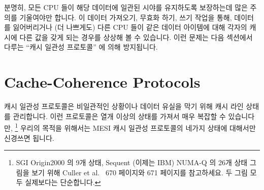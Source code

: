 분명히, 모든 CPU 들이 해당 데이터에 일관된 시야를 유지하도록 보장하는데 많은
주의를 기울여야만 합니다.
이 데이터 가져오기, 무효화 하기, 쓰기 작업을 통해, 데이터를 잃어버리거나 (더
나쁘게도) 다른 CPU 들이 같은 데이터 아이템에 대해 각자의 캐시에 다른 값을 갖게
되는 경우를 상상해 볼 수 있습니다.
이런 문제는 다음 섹션에서 다루는 ``캐시 일관성 프로토콜'' 에 의해 방지됩니다.

\section{Cache-Coherence Protocols}
\label{sec:app:whymb:Cache-Coherence Protocols}

캐시 일관성 프로토콜은 비일관적인 상황이나 데이터 유실을 막기 위해 캐시 라인
상태를 관리합니다.
이런 프로토콜은 열개 이상의 상태를 가져서 매우 복잡할 수 있습니다만, \footnote{
	SGI Origin2000 의 9개 상태, Sequent (이제는 IBM) NUMA-Q 의 26개 상태
	그림을 보기 위해 Culler et al.~\cite{DavidECuller1999} 670 페이지와 671
	페이지를 참고하세요.
	두 그림 모두 실제보다는 단순합니다.}
우리의 목적을 위해서는 MESI 캐시 일관성 프로토콜의 네가지 상태에 대해서만
신경쓰면 됩니다.

